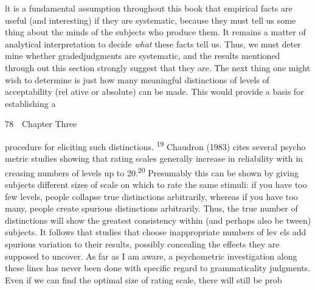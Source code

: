 \begin{styleTextbody}
lt is a fundamental assumption throughout this book that empirical facts are useful (and interesting) if they are systematic, because they must tell us some\- thing about the minds of the subjects who produce them. It remains a matter of analytical interpretation to decide \textit{what}\textit{ }these facts tell us. Thus, we must deter\- mine whether gradedjudgments are systematic, and the results mentioned through\- out this section strongly suggest that they are. The next thing one might wish to determine is just how many meaningful distinctions of levels of acceptability (rel\- ative or absolute) can be made. This would provide a basis for establishing a
\end{styleTextbody}


\clearpage\setcounter{page}{1}\begin{styleStandard}
78\ \ Chapter Three
\end{styleStandard}


\begin{styleTextbody}
procedure for eliciting such distinctions. \textsuperscript{19}\textsuperscript{ }Chaudron (1983) cites several psycho\- metric studies showing that rating scales generally increase in reliability with in\- creasing numbers of levels up to 20.\textsuperscript{20}\textsuperscript{ }Presumably this can be shown by giving subjects different sizes of scale on which to rate the same stimuli: if you have too few levels, people collapse true distinctions arbitrarily, whereas if you have too many, people create spurious distinctions arbitrarily. Thus, the {\textquotedbl}true{\textquotedbl} number of distinctions will show the greatest consistency within (and perhaps also be\- tween) subjects. It follows that studies that choose inappropriate numbers of lev\- els add spurious variation to their results, possibly concealing the effects they are supposed to uncover. As far as I am aware, a psychometric investigation along these lines has never been done with specific regard to grammaticality judgments. Even if we can find the optimal size of rating scale, there will still be prob\-
\end{styleTextbody}


